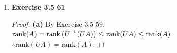 \begin{enumerate}
\begin{proof}
		\noindent \textbf{(a)}
		For $ n\times m $ matrix $ A $ and $ m\times r $ matrix $ B $, 
		$ AB=A\begin{bmatrix}
		\textbf{B}^C_1 & \textbf{B}^C_2 & \cdots & \textbf{B}^C_r
		\end{bmatrix} = \begin{bmatrix}
		A\textbf{B}^C_1 & A\textbf{B}^C_2 & \cdots & A\textbf{B}^C_r
		\end{bmatrix} \begin{bmatrix}
		\left(B_{11}\textbf{A}^C_1 + \cdots + B_{m1}\textbf{A}^C_m \right) & \cdots & \left(B_{1r}\textbf{A}^C_1 + \cdots + B_{mr}\textbf{A}^C_m \right)
		\end{bmatrix}$
		Since columns of $ AB $ are linear combinations of $ \textbf{A}^C_1 \cdots \textbf{A}^C_m$, $ \text{col}(AB) \subset \text{col}(A) $. \\
		$ \therefore $ By Lemma, $ \text{rank}(AB) \leq \text{rank}(B) $.
		\noindent \textbf{(b)}
		In case when $ B=O $
	\end{proof}
	Another solution of \textbf{(a)} :
	\begin{proof}
		\begin{align*}
		\text{rank}(AB) &= \text{rank}(B^{T}A^{T}) && \text{(Theorem 3.21)} \\
		&\leq \text{rank}(A^{T}) && \text{(Exercise 3.5 59)} \\
		&= \text{rank}(A) && \text{(Theorem 3.21)} \\
		\end{align*}
	\end{proof}
	\item \textbf{Exercise 3.5 61}
	\begin{proof}
		\noindent \textbf{(a)} 
		By Exercise 3.5 59, $ \text{rank}(A) = \text{rank}\left(\inv{U}\left(UA\right)\right) \leq \text{rank}(UA) \leq \text{rank}(A) $. $ \therefore \text{rank}(UA) = \text{rank}(A) $. 
		

\end{proof}
\end{enumerate}
